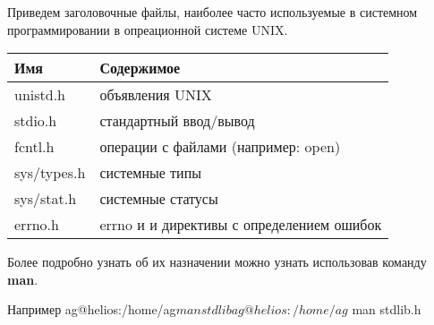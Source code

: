 Приведем заголовочные файлы, наиболее часто используемые в системном программировании в опреационной системе UNIX.

	\begin{center}
		\begin{tabular}{l|l}	
			\textbf{Имя} & \textbf{Содержимое} \\
			\hline
			unistd.h 	& объявления UNIX \\
			\hline
			stdio.h  	& стандартный ввод/вывод \\
			\hline
			fcntl.h  	& операции с файлами (например: open) \\
			\hline
			sys/types.h	& системные типы \\
			\hline
			sys/stat.h	& системные статусы \\
			\hline
			errno.h	& errno и и директивы с определением ошибок \\
		\end{tabular}
		\end{center}
		
Более подробно узнать об их назначении можно узнать использовав команду \textbf{man}.

	\begin{shCode}{Например}
		ag@helios:/home/ag$ man stdlib 
		ag@helios:/home/ag$ man stdlib.h \end{shCode}